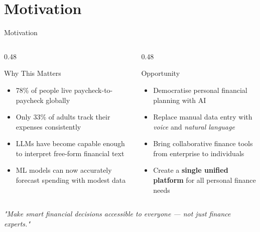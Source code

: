 \documentclass[aspectratio=169, 11pt]{beamer}
\begin{document}
\section{Motivation}
\begin{frame}{Motivation}
  \begin{columns}[T]
    \begin{column}{0.48\textwidth}
      \begin{block}{Why This Matters}
        \begin{itemize}
          \item 78\% of people live paycheck-to-paycheck globally
          \item Only 33\% of adults track their expenses consistently
          \item LLMs have become capable enough to interpret free-form financial text
          \item ML models can now accurately forecast spending with modest data
        \end{itemize}
      \end{block}
    \end{column}
    \begin{column}{0.48\textwidth}
      \begin{block}{Opportunity}
        \begin{itemize}
          \item Democratise personal financial planning with AI
          \item Replace manual data entry with \textit{voice} and \textit{natural language}
          \item Bring collaborative finance tools from enterprise to individuals
          \item Create a \textbf{single unified platform} for all personal finance needs
        \end{itemize}
      \end{block}
    \end{column}
  \end{columns}

  \vspace{10pt}
  \begin{center}
    \textcolor{auraviolet}{\textit{"Make smart financial decisions accessible to everyone — not just finance experts."}}
  \end{center}
\end{frame}

\end{document}
